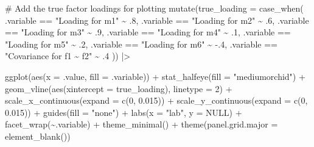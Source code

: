 \documentclass[
  letterpaper,
  DIV=11,
  numbers=noendperiod]{scrreprt}
\newenvironment{Shaded}{\begin{snugshade}}{\end{snugshade}}
\newcommand{\AttributeTok}[1]{\textcolor[rgb]{0.40,0.45,0.13}{#1}}
\newcommand{\CommentTok}[1]{\textcolor[rgb]{0.37,0.37,0.37}{#1}}
\newcommand{\ConstantTok}[1]{\textcolor[rgb]{0.56,0.35,0.01}{#1}}
\newcommand{\DecValTok}[1]{\textcolor[rgb]{0.68,0.00,0.00}{#1}}
\newcommand{\FloatTok}[1]{\textcolor[rgb]{0.68,0.00,0.00}{#1}}
\newcommand{\FunctionTok}[1]{\textcolor[rgb]{0.28,0.35,0.67}{#1}}
\newcommand{\NormalTok}[1]{\textcolor[rgb]{0.00,0.23,0.31}{#1}}
\newcommand{\SpecialCharTok}[1]{\textcolor[rgb]{0.37,0.37,0.37}{#1}}
\newcommand{\StringTok}[1]{\textcolor[rgb]{0.13,0.47,0.30}{#1}}
\begin{document}
\begin{Shaded}
\begin{Highlighting}[]
  \CommentTok{\# Add the true factor loadings for plotting}
  \FunctionTok{mutate}\NormalTok{(}\AttributeTok{true\_loading =} \FunctionTok{case\_when}\NormalTok{(}
\NormalTok{    .variable }\SpecialCharTok{==} \StringTok{"Loading for m1"} \SpecialCharTok{\textasciitilde{}}\NormalTok{ .}\DecValTok{8}\NormalTok{,}
\NormalTok{    .variable }\SpecialCharTok{==} \StringTok{"Loading for m2"} \SpecialCharTok{\textasciitilde{}}\NormalTok{ .}\DecValTok{6}\NormalTok{,}
\NormalTok{    .variable }\SpecialCharTok{==} \StringTok{"Loading for m3"} \SpecialCharTok{\textasciitilde{}}\NormalTok{ .}\DecValTok{9}\NormalTok{,}
\NormalTok{    .variable }\SpecialCharTok{==} \StringTok{"Loading for m4"} \SpecialCharTok{\textasciitilde{}}\NormalTok{ .}\DecValTok{1}\NormalTok{,}
\NormalTok{    .variable }\SpecialCharTok{==} \StringTok{"Loading for m5"} \SpecialCharTok{\textasciitilde{}}\NormalTok{ .}\DecValTok{2}\NormalTok{,}
\NormalTok{    .variable }\SpecialCharTok{==} \StringTok{"Loading for m6"} \SpecialCharTok{\textasciitilde{}} \SpecialCharTok{{-}}\NormalTok{.}\DecValTok{4}\NormalTok{,}
\NormalTok{    .variable }\SpecialCharTok{==} \StringTok{"Covariance for f1 \textasciitilde{} f2"} \SpecialCharTok{\textasciitilde{}}\NormalTok{ .}\DecValTok{4}
\NormalTok{  )) }\SpecialCharTok{|\textgreater{}}

  \FunctionTok{ggplot}\NormalTok{(}\FunctionTok{aes}\NormalTok{(}\AttributeTok{x =}\NormalTok{ .value, }\AttributeTok{fill =}\NormalTok{ .variable)) }\SpecialCharTok{+}
  \FunctionTok{stat\_halfeye}\NormalTok{(}\AttributeTok{fill =} \StringTok{"mediumorchid"}\NormalTok{) }\SpecialCharTok{+}
  \FunctionTok{geom\_vline}\NormalTok{(}\FunctionTok{aes}\NormalTok{(}\AttributeTok{xintercept =}\NormalTok{ true\_loading), }\AttributeTok{linetype =} \DecValTok{2}\NormalTok{) }\SpecialCharTok{+} 
  \FunctionTok{scale\_x\_continuous}\NormalTok{(}\AttributeTok{expand =} \FunctionTok{c}\NormalTok{(}\DecValTok{0}\NormalTok{, }\FloatTok{0.015}\NormalTok{)) }\SpecialCharTok{+}
  \FunctionTok{scale\_y\_continuous}\NormalTok{(}\AttributeTok{expand =} \FunctionTok{c}\NormalTok{(}\DecValTok{0}\NormalTok{, }\FloatTok{0.015}\NormalTok{)) }\SpecialCharTok{+}
  \FunctionTok{guides}\NormalTok{(}\AttributeTok{fill =} \StringTok{"none"}\NormalTok{) }\SpecialCharTok{+}
  \FunctionTok{labs}\NormalTok{(}\AttributeTok{x =} \StringTok{"lab"}\NormalTok{,}
     \AttributeTok{y =} \ConstantTok{NULL}\NormalTok{)  }\SpecialCharTok{+}
  \FunctionTok{facet\_wrap}\NormalTok{(}\SpecialCharTok{\textasciitilde{}}\NormalTok{.variable) }\SpecialCharTok{+}
  \FunctionTok{theme\_minimal}\NormalTok{() }\SpecialCharTok{+} 
  \FunctionTok{theme}\NormalTok{(}\AttributeTok{panel.grid.major =} \FunctionTok{element\_blank}\NormalTok{())}
\end{Highlighting}
\end{Shaded}
\end{document}
